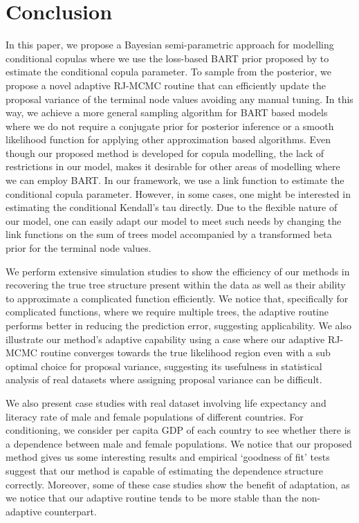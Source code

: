\documentclass[
12pt]{article}
\begin{document}
	\section{Conclusion}\label{sec:conc}
	
	In this paper, we propose a Bayesian semi-parametric approach for modelling conditional copulas where we use the loss-based BART prior proposed by \citet{serafini2024lossbasedpriortreetopologies} to estimate the conditional copula parameter. To sample from the posterior, we propose a novel adaptive RJ-MCMC routine that can efficiently update the proposal variance of the terminal node values avoiding any manual tuning. In this way, we achieve a more general sampling algorithm for BART based models where we do not require a conjugate prior for posterior inference or a smooth likelihood function for applying other approximation based algorithms. Even though our proposed method is developed for copula modelling, the lack of restrictions in our model, makes it desirable for other areas of modelling where we can employ BART. In our framework, we use a link function to estimate the conditional copula parameter. However, in some cases, one might be interested in estimating the conditional Kendall's tau directly. Due to the flexible nature of our model, one can easily adapt our model to meet such needs by changing the link functions on the sum of trees model accompanied by a transformed beta prior \citep{gokhale_prior_cor} for the terminal node values.
	
	We perform extensive simulation studies to show the efficiency of our methods in recovering the true tree structure present within the data as well as their ability to approximate a complicated function efficiently. We notice that, specifically for complicated functions, where we require multiple trees, the adaptive routine performs better in reducing the prediction error, suggesting applicability. We also illustrate our method's adaptive capability using a case where our adaptive RJ-MCMC routine converges towards the true likelihood region even with a sub optimal choice for proposal variance, suggesting its usefulness in statistical analysis of real datasets where assigning proposal variance can be difficult. 
	
	We also present case studies with real dataset involving life expectancy and literacy rate of male and female populations of different countries. For conditioning, we consider per capita GDP of each country to see whether there is a dependence between male and female populations. We notice that our proposed method gives us some interesting results and empirical `goodness of fit' tests suggest that our method is capable of estimating the dependence structure correctly. Moreover, some of these case studies show the benefit of adaptation, as we notice that our adaptive routine tends to be more stable than the non-adaptive counterpart.
	
\end{document}
